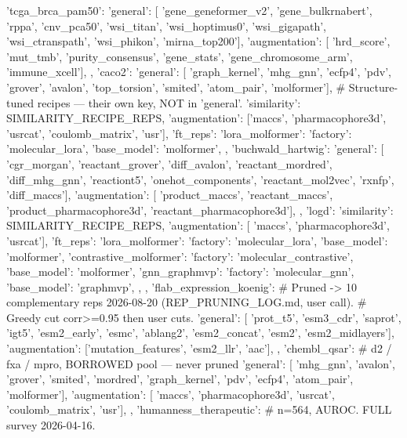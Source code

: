    'tcga_brca_pam50': {
        'general': [
            'gene_geneformer_v2', 'gene_bulkrnabert', 'rppa', 'cnv_pca50', 'wsi_titan',
            'wsi_hoptimus0', 'wsi_gigapath', 'wsi_ctranspath', 'wsi_phikon', 'mirna_top200'],
        'augmentation': [
            'hrd_score', 'mut_tmb', 'purity_consensus', 'gene_stats',
            'gene_chromosome_arm', 'immune_xcell'],
    },
    'caco2': {
        'general': [
            'graph_kernel', 'mhg_gnn', 'ecfp4', 'pdv', 'grover', 'avalon',
            'top_torsion', 'smited', 'atom_pair', 'molformer'],
        # Structure-tuned recipes — their own key, NOT in 'general'.
        'similarity': SIMILARITY_RECIPE_REPS,
        'augmentation': ['maccs', 'pharmacophore3d', 'usrcat', 'coulomb_matrix', 'usr'],
        'ft_reps': {
            'lora_molformer': {'factory': 'molecular_lora', 'base_model': 'molformer'},
        },
    'buchwald_hartwig': {
        'general': [
            'cgr_morgan', 'reactant_grover', 'diff_avalon', 'reactant_mordred',
            'diff_mhg_gnn', 'reactiont5', 'onehot_components', 'reactant_mol2vec',
            'rxnfp', 'diff_maccs'],
        'augmentation': [
            'product_maccs', 'reactant_maccs',
            'product_pharmacophore3d', 'reactant_pharmacophore3d'],
    },
    'logd': {
        'similarity': SIMILARITY_RECIPE_REPS,
        'augmentation': [
            'maccs', 'pharmacophore3d', 'usrcat'],
        'ft_reps': {
            'lora_molformer': {'factory': 'molecular_lora', 'base_model': 'molformer'},
            'contrastive_molformer': {'factory': 'molecular_contrastive', 'base_model': 'molformer'},
            'gnn_graphmvp': {'factory': 'molecular_gnn', 'base_model': 'graphmvp'},
        },
    },
    'flab_expression_koenig': {
        # Pruned -> 10 complementary reps 2026-08-20 (REP_PRUNING_LOG.md, user call).
        # Greedy cut corr>=0.95 then user cuts.
        'general': [
            'prot_t5', 'esm3_cdr', 'saprot', 'igt5', 'esm2_early', 'esmc',
            'ablang2', 'esm2_concat', 'esm2', 'esm2_midlayers'],
        'augmentation': ['mutation_features', 'esm2_llr', 'aac'],
    },
    'chembl_qsar': {  # d2 / fxa / mpro, BORROWED pool — never pruned
        'general': [
            'mhg_gnn', 'avalon', 'grover', 'smited', 'mordred',
            'graph_kernel', 'pdv', 'ecfp4', 'atom_pair', 'molformer'],
        'augmentation': [
            'maccs', 'pharmacophore3d', 'usrcat', 'coulomb_matrix', 'usr'],
    },
    'humanness_therapeutic': {  # n=564, AUROC. FULL survey 2026-04-16.
}}
